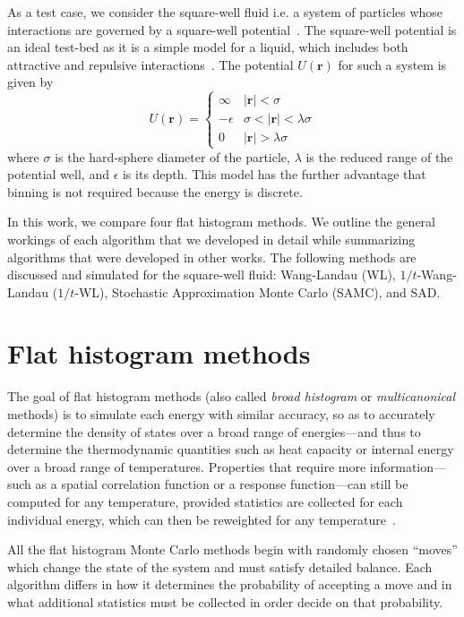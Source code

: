\documentclass[letterpaper,twocolumn,amsmath,amssymb,pre,aps,10pt]{revtex4-1}
\begin{document}
As a test case, we consider the square-well fluid i.e. a system of particles
whose interactions are governed by a square-well
potential~\cite{singh2003surface, barker2004perturbationSW}.  The square-well
potential is an ideal test-bed as it is a simple model for a liquid, which
includes both attractive and repulsive
interactions~\cite{barker1967-SW-perturbation, vega1992phase}.  The potential
$U(\textbf{r})$ for such a system is given by
\begin{equation}
 U(\textbf{r})=\begin{cases} \infty &
 \lvert\textbf{r}\rvert< \sigma\\-\epsilon &
 \sigma<\lvert\textbf{r}\rvert<\lambda\sigma\\0 &
 \lvert\textbf{r}\rvert > \lambda\sigma\end{cases}
\end{equation}
where $\sigma$ is the hard-sphere diameter of the particle, $\lambda$ is the
reduced range of the potential well, and $\epsilon$ is its depth. This model has
the further advantage that binning is not required because the energy is
discrete.

In this work, we compare four flat histogram methods.  We outline the
general workings of each algorithm that we developed in detail while
summarizing algorithms that were developed in other works.  The
following methods are discussed and simulated for the square-well
fluid: Wang-Landau (WL), $1/t$-Wang-Landau ($1/t$-WL), Stochastic
Approximation Monte Carlo (SAMC), and SAD.

\section{Flat histogram methods}\label{sec:histogram}
The goal of flat histogram methods (also called \emph{broad histogram}
or \emph{multicanonical} methods) is to simulate each energy with
similar accuracy, so as to accurately determine the density of states
over a broad range of energies---and thus to determine the thermodynamic
quantities such as heat capacity or internal energy
over a broad range of temperatures.
Properties that require more information---such as a spatial
correlation function or a response function---can still be computed
for any temperature, provided statistics are collected for each
individual energy, which can then be reweighted for any
temperature~\cite{panagiotopoulos1998phase, panagiotopoulos2000monte,
errington2003direct}.

All the flat histogram Monte Carlo methods begin with randomly chosen
``moves'' which change the state of the system and must satisfy
detailed balance.  Each algorithm differs in how it determines the
probability of accepting a move and in what additional statistics must
be collected in order decide on that probability.
\end{document}
